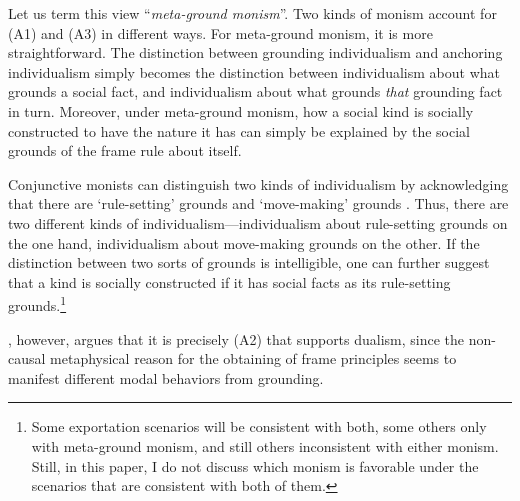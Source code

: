 \documentclass[12pt]{article}
\begin{document}
\begin{center}
\end{center}
Let us term this view ``\textit{meta-ground monism}''. Two kinds of monism account for (A1) and (A3) in different ways. For meta-ground monism, it is more straightforward. The distinction between grounding individualism and anchoring individualism simply becomes the distinction between individualism about what grounds a social fact, and individualism about what grounds \textit{that} grounding fact in turn. Moreover, under meta-ground monism, how a social kind is socially constructed to have the nature it has can simply be explained by the social grounds of the frame rule about itself. 

\par
Conjunctive monists can distinguish two kinds of individualism by acknowledging that there are `rule-setting' grounds and `move-making' grounds \citep[760--1]{Schaffer2019-SCHAAG-5}. Thus, there are two different kinds of individualism---individualism about rule-setting grounds on the one hand, individualism about move-making grounds on the other. If the distinction between two sorts of grounds is intelligible, one can further suggest that a kind is socially constructed if it has social facts as its rule-setting grounds.\footnote{Some exportation scenarios will be consistent with both, some others only with meta-ground monism, and still others inconsistent with either monism. Still, in this paper, I do not discuss which monism is favorable under the scenarios that are consistent with both of them.}

\par
\citet{Epstein2015-EPSTAT,Epstein2019-EPSAVG}, however, argues that it is precisely (A2) that supports dualism, since the non-causal metaphysical reason for the obtaining of frame principles seems to manifest different modal behaviors from grounding. 



\end{document}
